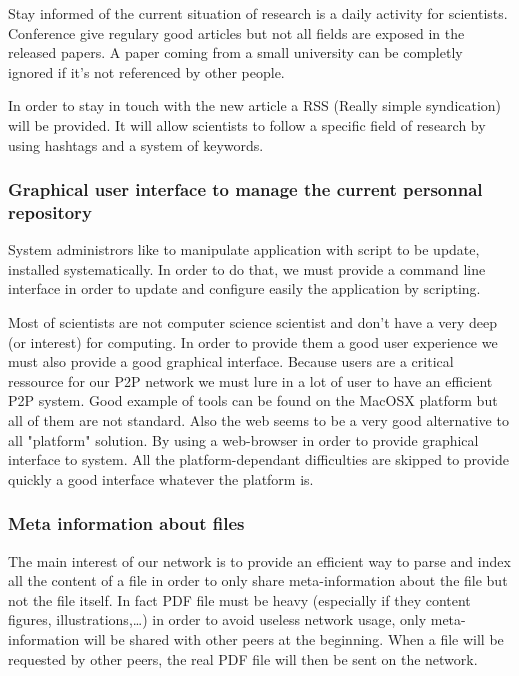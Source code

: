 Stay informed of the current situation of research is a daily
activity for scientists. Conference give regulary good articles but
not all fields are exposed in the released papers. A paper coming from
a small university can be completly ignored if it's not referenced by
other people.

In order to stay in touch with the new article a RSS 
(Really simple syndication) will be provided. It will allow scientists
to follow a specific field of research by using hashtags and a system
of keywords.

\subsubsection{Graphical user interface to manage the current personnal repository}

System administrors like to manipulate application with script to be update, installed
systematically. In order to do that, we must provide a command line interface in order
to update and configure easily the application by scripting.

Most of scientists are not computer science scientist and don't have a very deep (or interest)
for computing. In order to provide them a good user experience we must also provide a good 
graphical interface. Because users are a critical ressource for our P2P network we 
must lure in a lot of user to have an efficient P2P system. Good example
of tools can be found on the MacOSX platform but all of them
are not standard. Also the web seems to be a very good alternative
to all "platform" solution. By using a web-browser in order
to provide graphical interface to system. All the platform-dependant
difficulties are skipped to provide quickly a good interface whatever
the platform is.

\subsubsection{Meta information about files}

The main interest of our network is to provide an efficient way to parse and
index all the content of a file in order to only share meta-information about the
file but not the file itself. In fact PDF file must be heavy (especially if
they content figures, illustrations,\ldots) in order to avoid useless network usage,
only meta-information will be shared with other peers at the beginning. When a file
will be requested by other peers, the real PDF file will then be sent on the network.

